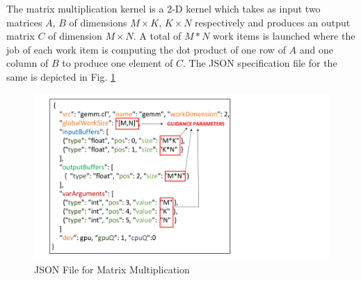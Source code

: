     The matrix multiplication kernel is a 2-D kernel which takes as input two matrices $A$, $B$ of dimensions $M \times K$, $K \times N$ respectively and produces an output matrix $C$ of dimension $M \times N$. A total of $M*N$ work items is launched where the job of each work item is computing the dot product of one row of $A$ and one column of $B$ to produce one element of $C$. The JSON specification file for the same is depicted in Fig. \ref{fig:json}
    
    \begin{figure}[ht]  
		\centering
		\includegraphics[scale=0.4]{Pictures/json_file.pdf}
		\caption{JSON File for Matrix Multiplication \label{fig:json}}
    \end{figure}
    
